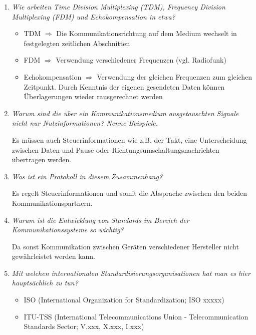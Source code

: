 \documentclass[hidelinks]{article}
\begin{document}
\begin{enumerate}
\item \textit{Wie arbeiten Time Division Multiplexing (TDM), Frequency Division Multiplexing (FDM) und Echokompensation in etwa?}

\begin{itemize}
\item TDM $\Rightarrow$ Die Kommunikationsrichtung auf dem Medium wechselt in festgelegten zeitlichen Abschnitten
\item FDM $\Rightarrow$ Verwendung verschiedener Frequenzen (vgl. Radiofunk)
\item Echokompensation $\Rightarrow$ Verwendung der gleichen Frequenzen zum gleichen Zeitpunkt. Durch Kenntnis der eigenen gesendeten Daten können Überlagerungen wieder rausgerechnet werden
\end{itemize}

\item \textit{Warum sind die über ein Kommunikationsmedium ausgetauschten Signale nicht nur Nutzinformationen? Nenne Beispiele.}

Es müssen auch Steuerinformationen wie z.B. der Takt, eine Unterscheidung zwischen Daten und Pause oder Richtungsumschaltungsnachrichten übertragen werden.\\

\item \textit{Was ist ein Protokoll in diesem Zusammenhang?}

Es regelt Steuerinformationen und somit die Absprache zwischen den beiden Kommunikationspartnern.

\item \textit{Warum ist die Entwicklung von Standards im Bereich der Kommunikationssysteme so wichtig?}

Da sonst Kommunikation zwischen Geräten verschiedener Hersteller nicht gewährleistet werden kann.

\item \textit{Mit welchen internationalen Standardisierungsorganisationen hat man es hier hauptsächlich zu tun?}

\begin{itemize}
\item ISO (International Organization for Standardization; ISO xxxxx)
\item ITU-TSS (International Telecommunications Union - Telecommunication Standards Sector; V.xxx, X.xxx, I.xxx)
\end{itemize}
\end{enumerate}
\end{document}
